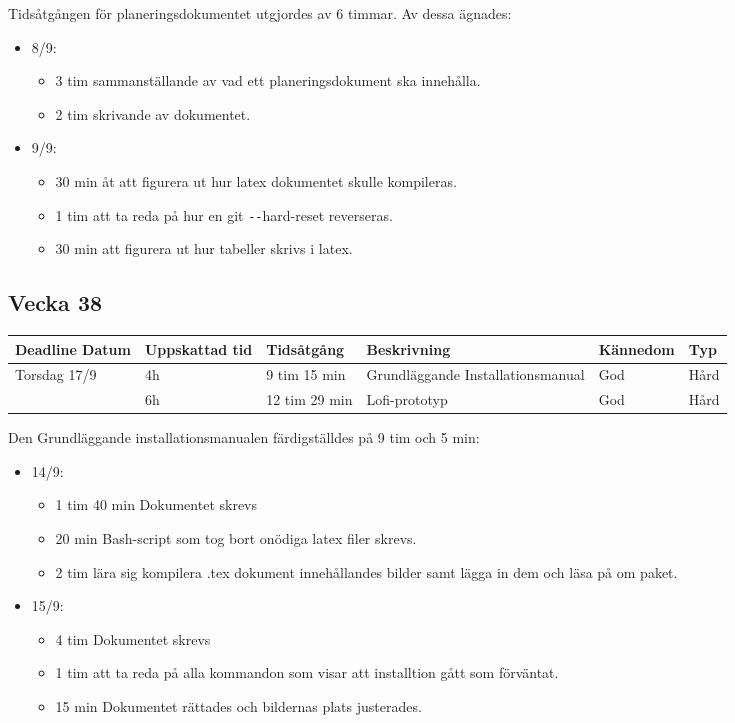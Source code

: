 \documentclass{TDP003mall}
\begin{document}
Tidsåtgången för planeringsdokumentet utgjordes av 6 timmar. Av dessa ägnades:
\begin{itemize}
	\item 8/9:
	\begin{itemize}
		\item 3 tim sammanställande av vad ett planeringsdokument ska innehålla.
		\item 2 tim skrivande av dokumentet.
	\end{itemize}
	\item 9/9:
	\begin{itemize}
		\item 30 min åt att figurera ut hur latex dokumentet skulle kompileras.
		\item 1 tim att ta reda på hur en git \texttt{-{}-}hard-reset reverseras.
		\item 30 min att figurera ut hur tabeller skrivs i latex.\\
	\end{itemize}
\end{itemize}

\subsection{Vecka 38}
\begin{tabularx}{\linewidth}{|l|l|l|X|l|l|}
	\hline
	Deadline Datum & Uppskattad tid & Tidsåtgång    & Beskrivning                       & Kännedom & Typ  \\ [0.5ex]
	\hline
	Torsdag 17/9   & 4h             & 9 tim 15 min  & Grundläggande Installationsmanual & God      & Hård \\
	\hline
                   & 6h             & 12 tim 29 min & Lofi-prototyp                     & God      & Hård \\
	\hline
\end{tabularx}

Den Grundläggande installationsmanualen färdigställdes på 9 tim och 5 min:
\begin{itemize}
	\item 14/9:
	\begin{itemize}
		\item 1 tim 40 min Dokumentet skrevs
		\item 20 min Bash-script som tog bort onödiga latex filer skrevs.
		\item 2 tim lära sig kompilera .tex dokument innehållandes bilder samt lägga in dem och läsa på om paket.
	\end{itemize}
	\item 15/9:
	\begin{itemize}
		\item 4 tim Dokumentet skrevs
		\item 1 tim att ta reda på alla kommandon som visar att installtion gått som förväntat.
		\item 15 min Dokumentet rättades och bildernas plats justerades.\\
	\end{itemize}
\end{itemize}
\end{document}
